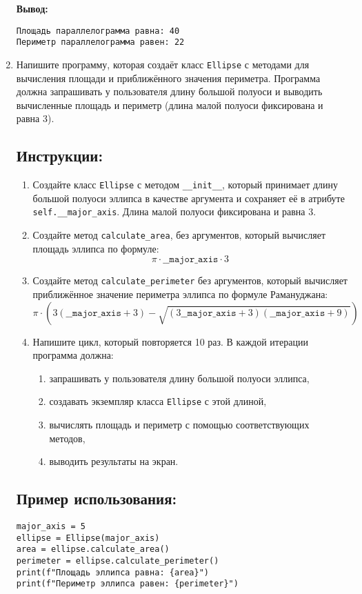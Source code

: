 \begin{enumerate}
\textbf{Вывод:}
\begin{verbatim}
Площадь параллелограмма равна: 40
Периметр параллелограмма равен: 22
\end{verbatim}


\item
Напишите программу, которая создаёт класс \texttt{Ellipse} с методами для вычисления площади
и приближённого значения периметра. Программа должна запрашивать у пользователя длину большой полуоси
и выводить вычисленные площадь и периметр (длина малой полуоси фиксирована и равна 3).

\subsection*{Инструкции:}
\begin{enumerate}
\item Создайте класс \texttt{Ellipse} с методом
\texttt{\_\_init\_\_}, который принимает длину большой полуоси эллипса в
качестве аргумента и сохраняет её в атрибуте \texttt{self.\_\_major\_axis}.
Длина малой полуоси фиксирована и равна 3.

\item Создайте метод \texttt{calculate\_area},
без аргументов, который вычисляет площадь эллипса по формуле:
\[
\pi \cdot \texttt{\_\_major\_axis} \cdot 3
\]

\item Создайте метод \texttt{calculate\_perimeter} без аргументов,
который вычисляет приближённое значение периметра эллипса по формуле Рамануджана:
\[
\pi \cdot \left(3(\texttt{\_\_major\_axis} + 3) - \sqrt{(3\texttt{\_\_major\_axis} + 3)(\texttt{\_\_major\_axis} + 9)}\right)
\]

\item Напишите цикл, который повторяется 10 раз. В каждой итерации программа должна:
\begin{enumerate}
\item запрашивать у пользователя длину большой полуоси эллипса,
\item создавать экземпляр класса \texttt{Ellipse} с этой длиной,
\item вычислять площадь и периметр с помощью соответствующих методов,
\item выводить результаты на экран.
\end{enumerate}
\end{enumerate}

\subsection*{Пример использования:}
\begin{verbatim}
major_axis = 5
ellipse = Ellipse(major_axis)
area = ellipse.calculate_area()
perimeter = ellipse.calculate_perimeter()
print(f"Площадь эллипса равна: {area}")
print(f"Периметр эллипса равен: {perimeter}")
\end{verbatim}


\end{enumerate}
